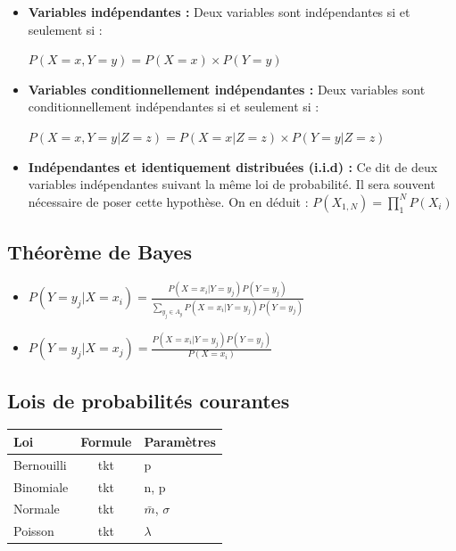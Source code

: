 \documentclass{article}
\begin{document}
\begin{itemize}

\item \textbf{Variables indépendantes :} Deux variables sont indépendantes si et seulement si :

$ P(X = x, Y = y) = P(X = x) \times P(Y = y) $

\item \textbf{Variables conditionnellement indépendantes :} Deux variables sont conditionnellement indépendantes si et seulement si :

$ P(X = x, Y = y | Z = z) = P(X = x | Z = z) \times P(Y = y | Z = z) $

\item \textbf{Indépendantes et identiquement distribuées (i.i.d) :} Ce dit de deux variables indépendantes suivant la même loi de probabilité. Il sera souvent nécessaire de poser cette hypothèse. On en déduit : $P(X_{1, N} ) = \prod_{1}^{N} P(X_i)$

\end{itemize}

\subsection{Théorème de Bayes}

\begin{itemize}

\item $ P(Y = y_j | X = x_i) = \frac{P(X = x_i | Y = y_j) P(Y = y_j)}{\sum_{y_j \in A_y} P(X = x_i | Y = y_j) P(Y = y_j)}  $

\item $ P(Y = y_j | X = x_j) = \frac{P(X = x_i | Y = y_j) P(Y = y_j)}{P(X = x_i)} $

\end{itemize}

\subsection{Lois de probabilités courantes}

\begin{tabular}{|l|c|l|}
  \hline
  Loi & Formule & Paramètres \\
  \hline
  Bernouilli & tkt & p \\
  Binomiale & tkt & n, p \\
  Normale & tkt & $\bar{m}$, $\sigma$ \\
  Poisson & tkt & $\lambda$ \\
  \hline
\end{tabular}
\end{document}
